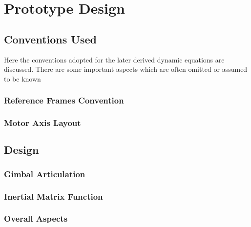 \chapter{Prototype Design}
\label{ch:proto}
\section{Conventions Used}
\label{sec:proto.conventions}
Here the conventions adopted for the later derived dynamic equations are discussed. There are some important aspects which are often omitted or assumed to be known 
\subsection{Reference Frames Convention}
\label{subsec:proto.conventions.frames}
\subsection{Motor Axis Layout}
\label{subsec:proto.conventions.motoraxis}

\section{Design}
\label{sec:proto.design}
\subsection{Gimbal Articulation}
\label{subsec:proto.design.actuation}
\subsection{Inertial Matrix Function}
\label{subsec:proto.design.inertia}
\subsection{Overall Aspects}
\label{subsec:proto.design.aspects}
